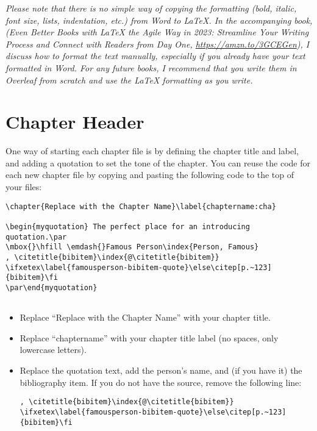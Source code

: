 \textit{Please note that there is no simple way of copying the formatting (bold, italic, font size, lists, indentation, etc.) from Word to LaTeX. In the accompanying book, (\textit{Even Better Books with LaTeX the Agile Way in 2023: Streamline Your Writing Process and Connect with Readers from Day One}, \url{https://amzn.to/3GCEGen}), I discuss how to format the text manually, especially if you already have your text formatted in Word. For any future books, I recommend that you write them in Overleaf from scratch and use the LaTeX formatting as you write.}


\section{Chapter Header}

One way of starting each chapter file is by defining the chapter title and label, and adding a quotation to set the tone of the chapter. You can reuse the code for each new chapter file by copying and pasting the following code to the top of your files:

\begin{lstlisting}
\chapter{Replace with the Chapter Name}\label{chaptername:cha}

\begin{myquotation} The perfect place for an introducing quotation.\par
\mbox{}\hfill \emdash{}Famous Person\index{Person, Famous}
, \citetitle{bibitem}\index{@\citetitle{bibitem}} \ifxetex\label{famousperson-bibitem-quote}\else\citep[p.~123]{bibitem}\fi
\par\end{myquotation}


\end{lstlisting}


\begin{itemize}
\item Replace ``Replace with the Chapter Name'' with your chapter title.
\item Replace ``chaptername'' with your chapter title label (no spaces, only lowercase letters).
\item Replace the quotation text, add the person's name, and (if you have it) the bibliography item. If you do not have the source, remove the following line:

\begin{lstlisting}
, \citetitle{bibitem}\index{@\citetitle{bibitem}} \ifxetex\label{famousperson-bibitem-quote}\else\citep[p.~123]{bibitem}\fi
\end{lstlisting}
\end{itemize}

